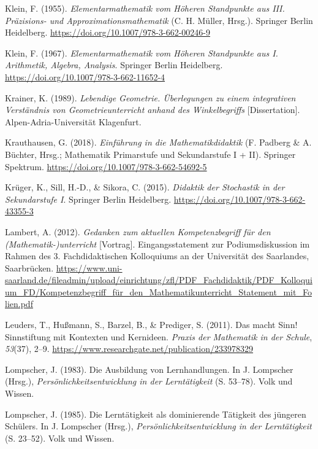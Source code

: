 \documentclass[
]{scrbook}
\newlength{\cslhangindent}
\newenvironment{CSLReferences}[2] %
 {\begin{list}{}{%
  \setlength{\itemindent}{0pt}
  \setlength{\leftmargin}{0pt}
  \setlength{\parsep}{0pt}
  \ifodd #1
   \setlength{\leftmargin}{\cslhangindent}
   \setlength{\itemindent}{-1\cslhangindent}
  \fi
  \setlength{\itemsep}{#2\baselineskip}}}
 {\end{list}}
\theoremstyle{definition}
\theoremstyle{definition}
\theoremstyle{definition}
\theoremstyle{definition}
\theoremstyle{remark}
\begin{document}
\begin{CSLReferences}{1}{0}
Klein, F. (1955). \emph{Elementarmathematik vom {Höheren} {Standpunkte} aus {III}. {Präzisions}- und {Approximationsmathematik}} (C. H. Müller, Hrsg.). Springer Berlin Heidelberg. \url{https://doi.org/10.1007/978-3-662-00246-9}

Klein, F. (1967). \emph{Elementarmathematik vom {Höheren} {Standpunkte} aus {I}. {Arithmetik}, {Algebra}, {Analysis}}. Springer Berlin Heidelberg. \url{https://doi.org/10.1007/978-3-662-11652-4}

Krainer, K. (1989). \emph{Lebendige {Geometrie}. Überlegungen zu einem integrativen {Verständnis} von {Geometrieunterricht} anhand des {Winkelbegriffs}} {[}Dissertation{]}. Alpen-Adria-Universität Klagenfurt.

Krauthausen, G. (2018). \emph{Einführung in die {Mathematikdidaktik}} (F. Padberg \& A. Büchter, Hrsg.; Mathematik Primarstufe und Sekundarstufe I + II). Springer Spektrum. \url{https://doi.org/10.1007/978-3-662-54692-5}

Krüger, K., Sill, H.-D., \& Sikora, C. (2015). \emph{Didaktik der {Stochastik} in der {Sekundarstufe} {I}}. Springer Berlin Heidelberg. \url{https://doi.org/10.1007/978-3-662-43355-3}

Lambert, A. (2012). \emph{Gedanken zum aktuellen {Kompetenzbegriff} für den ({Mathematik}-)unterricht} {[}Vortrag{]}. Eingangsstatement zur Podiumsdiskussion im Rahmen des 3. Fachdidaktischen Kolloquiums an der Universität des Saarlandes, Saarbrücken. \url{https://www.uni-saarland.de/fileadmin/upload/einrichtung/zfl/PDF_Fachdidaktik/PDF_Kolloquium_FD/Kompetenzbegriff_für_den_Mathematikunterricht_Statement_mit_Folien.pdf}

Leuders, T., Hußmann, S., Barzel, B., \& Prediger, S. (2011). Das macht {Sinn}! {Sinnstiftung} mit {Kontexten} und {Kernideen}. \emph{Praxis der Mathematik in der Schule}, \emph{53}(37), 2--9. \url{https://www.researchgate.net/publication/233978329}

Lompscher, J. (1983). Die {Ausbildung} von {Lernhandlungen}. In J. Lompscher (Hrsg.), \emph{Persönlichkeitsentwicklung in der {Lerntätigkeit}} (S. 53--78). Volk und Wissen.

Lompscher, J. (1985). Die {Lerntätigkeit} als dominierende {Tätigkeit} des jüngeren {Schülers}. In J. Lompscher (Hrsg.), \emph{Persönlichkeitsentwicklung in der {Lerntätigkeit}} (S. 23--52). Volk und Wissen.


\end{CSLReferences}
\end{document}
